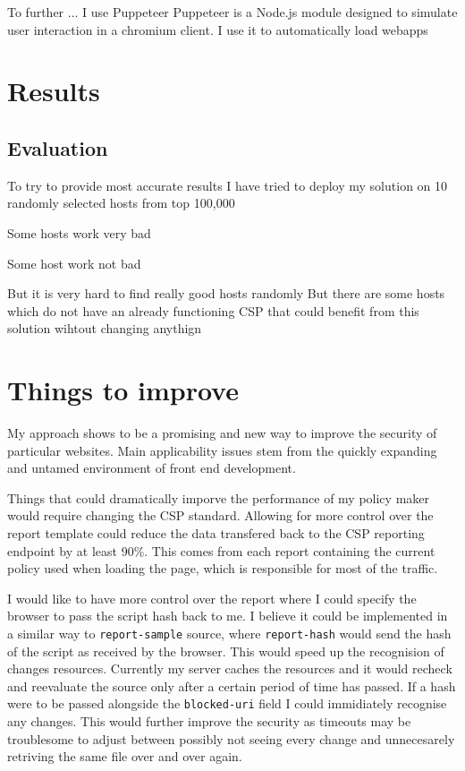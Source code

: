 To further ... I use Puppeteer
Puppeteer is a Node.js module designed to simulate user interaction in a chromium client.
I use it to automatically load webapps 

\section{Results}

\subsection{Evaluation}

To try to provide most accurate results I have tried to deploy my solution on 10 randomly selected hosts from top 100,000 

Some hosts work very bad

Some host work not bad

But it is very hard to find really good hosts randomly
But there are some hosts which do not have an already functioning CSP that could benefit from this solution wihtout changing anythign


\section{Things to improve}

My approach shows to be a promising and new way to improve the security of particular websites.
Main applicability issues stem from the quickly expanding and untamed environment of front end development.

Things that could dramatically imporve the performance of my policy maker would require changing the CSP standard.
Allowing for more control over the report template could reduce the data transfered back to the CSP reporting endpoint by at least 90\%.
This comes from each report containing the current policy used when loading the page, which is responsible for most of the traffic.

I would like to have more control over the report where I could specify the browser to pass the script hash back to me.
I believe it could be implemented in a similar way to \texttt{report-sample} source, where \texttt{report-hash} would send the hash of the script as received by the browser.
This would speed up the recognision of changes resources. 
Currently my server caches the resources and it would recheck and reevaluate the source only after a certain period of time has passed.
If a hash were to be passed alongside the \texttt{blocked-uri} field I could immidiately recognise any changes.
This would further improve the security as timeouts may be troublesome to adjust between possibly not seeing every change and unnecesarely retriving the same file over and over again.


